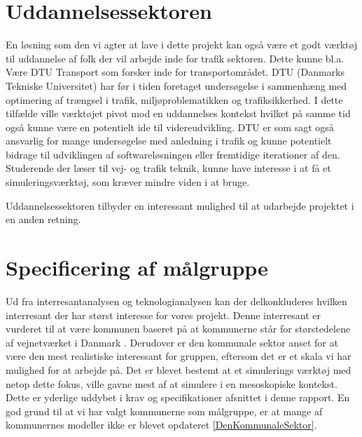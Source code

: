 \section{Uddannelsessektoren}
En løsning som den vi agter at lave i dette projekt kan også være et godt værktøj til uddannelse af folk der vil arbejde inde for trafik sektoren. Dette kunne bl.a. Være DTU Transport som forsker inde for transportområdet. DTU (Danmarks Tekniske Universitet) har før i tiden foretaget undersøgelse i sammenhæng med optimering af trængsel i trafik, miljøproblematikken og trafiksikkerhed\cite{DtuForskning}. I dette tilfælde ville værktøjet pivot mod en uddannelses kontekst hvilket på samme tid også kunne være en potentielt ide til videreudvikling. DTU er som sagt også ansvarlig for mange undersøgelse med anledning i trafik og kunne potentielt bidrage til udviklingen af softwareløsningen eller fremtidige iterationer af den. Studerende der læser til vej- og trafik teknik, kunne have interesse i at få et simuleringsværktøj, som kræver mindre viden i at bruge.

\vspace{5mm}

Uddannelsessektoren tilbyder en interessant mulighed til at udarbejde projektet i en anden retning. 

\section{Specificering af målgruppe}

Ud fra interresantanalysen og teknologianalysen kan der delkonkluderes hvilken interresant der har størst interesse for vores projekt. Denne interresant er vurderet til at være kommunen baseret på at kommunerne står for størstedelene af vejnetværket i Danmark \cite{benjasfar}. Derudover er den kommunale sektor anset for at være den mest realistiske interessant for gruppen, eftersom det er et skala vi har mulighed for at arbejde på. Det er blevet bestemt at et simulerings værktøj med netop dette fokus, ville gavne mest af at simulere i en mesoskopiske kontekst. Dette er yderlige uddybet i krav og specifikationer afsnittet i denne rapport. En god grund til at vi har valgt kommunerne som målgruppe, er at mange af kommunernes modeller ikke er blevet opdateret \ref{DenKommunaleSektor}. 
